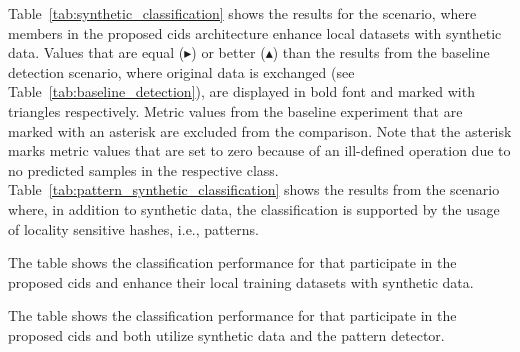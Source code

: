 \documentclass[../../main.tex]{subfiles}
\begin{document}
Table~\ref{tab:synthetic_classification} shows the results for the scenario, where members in the proposed \gls{cids} architecture enhance local datasets with synthetic data. Values that are equal ($\blacktriangleright$) or better ($\blacktriangle$) than the results from the baseline detection scenario, where original data is exchanged (see Table~\ref{tab:baseline_detection}), are displayed in bold font and marked with triangles respectively. Metric values from the baseline experiment that are marked with an asterisk are excluded from the comparison. Note that the asterisk marks metric values that are set to zero because of an ill-defined operation due to no predicted samples in the respective class. Table~\ref{tab:pattern_synthetic_classification} shows the results from the scenario where, in addition to synthetic data, the classification is supported by the usage of locality sensitive hashes, i.e., patterns. 

\begin{table}[H]
    \scriptsize
    \centering
    \setlength{\extrarowheight}{0pt}
    \addtolength{\extrarowheight}{\aboverulesep}
    \addtolength{\extrarowheight}{\belowrulesep}
    \addtolength{\tabcolsep}{-0.4em}
    \setlength{\aboverulesep}{0pt}
    \setlength{\belowrulesep}{0pt}
    \setlength{\extrarowheight}{.15em}
     
    \caption[Detection performance with synthetic data]{The table shows the classification performance for  that participate in the proposed \gls{cids} and enhance their local training datasets with synthetic data.}
    \label{tab:synthetic_classification}
\end{table}

\begin{table}[H]
    \scriptsize
    \centering
    \setlength{\extrarowheight}{0pt}
    \addtolength{\extrarowheight}{\aboverulesep}
    \addtolength{\extrarowheight}{\belowrulesep}
    \addtolength{\tabcolsep}{-0.4em}
    \setlength{\aboverulesep}{0pt}
    \setlength{\belowrulesep}{0pt}
    \setlength{\extrarowheight}{.15em}
     
    \caption[Detection performance with synthetic data and pattern detector]{The table shows the classification performance for  that participate in the proposed \gls{cids} and both utilize synthetic data and the pattern detector.}
    \label{tab:pattern_synthetic_classification}
\end{table}
\end{document}
